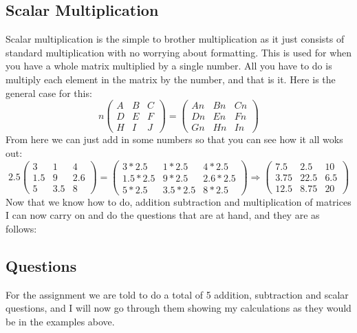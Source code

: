 \documentclass{article}
\begin{document}
\subsection{Scalar Multiplication}
Scalar multiplication is the simple to brother multiplication as it just consists of standard multiplication with no worrying about formatting. This is used for when you have a whole matrix multiplied by a single number. All you have to do is multiply each element in the matrix by the number, and that is it. Here is the general case for this:
\begin{equation*}
	n
	\begin{pmatrix}
		A & B & C\\
		D & E & F\\
		H & I & J
	\end{pmatrix}
	=
	\begin{pmatrix}
		An & Bn & Cn\\
		Dn & En & Fn\\
		Gn & Hn & In
	\end{pmatrix}
\end{equation*}
From here we can just add in some numbers so that you can see how it all woks out:
\begin{equation*}
	2.5
	\begin{pmatrix}
		3 & 1 & 4\\
		1.5 & 9 & 2.6\\
		5 & 3.5 & 8
	\end{pmatrix}
	=
	\begin{pmatrix}
		3*2.5 & 1*2.5 & 4*2.5\\
		1.5*2.5 & 9*2.5 & 2.6*2.5\\
		5*2.5 & 3.5*2.5 & 8*2.5
	\end{pmatrix}
	\Rightarrow
	\begin{pmatrix}
		7.5 & 2.5 & 10\\
		3.75 & 22.5 & 6.5\\
		12.5 & 8.75 & 20
	\end{pmatrix}
\end{equation*}
Now that we know how to do, addition subtraction and multiplication of matrices I can now carry on and do the questions that are at hand, and they are as follows:
\subsection{Questions}
For the assignment we are told to do a total of 5 addition, subtraction and scalar questions, and I will now go through them showing my calculations as they would be in the examples above. 
\end{document}
